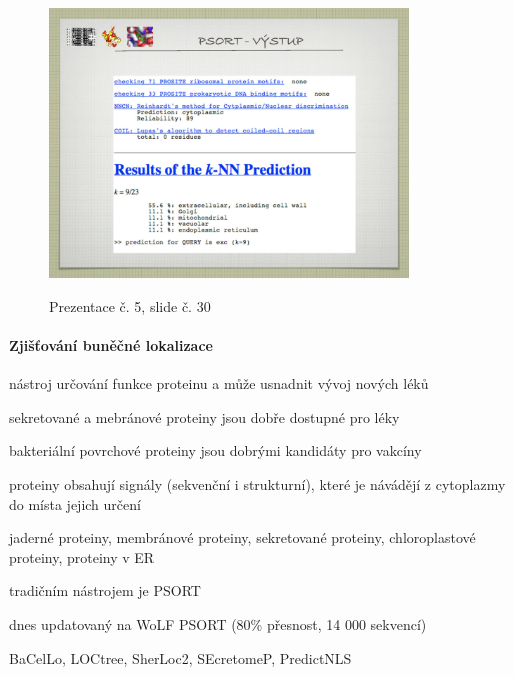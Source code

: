 \documentclass[DIV=8]{scrreprt}
\begin{document}
\begin{figure}
    \caption{Prezentace č. 5, slide č. 30}
    \includegraphics[width=0.85\textwidth]{slides-5/slide-30.jpg}
    \centering
    \label{slides-5-slide-30}
\end{figure}

\paragraph{Zjišťování buněčné lokalizace}
\begin{myItemize}[nosep]
    \item nástroj určování funkce proteinu a může usnadnit vývoj nových léků
\begin{myItemize}[nosep]
    \item sekretované a mebránové proteiny jsou dobře dostupné pro léky
    \item bakteriální povrchové proteiny jsou dobrými kandidáty pro vakcíny
\end{myItemize}

    \item proteiny obsahují signály (sekvenční i strukturní), které je návádějí z cytoplazmy do místa jejich určení
\begin{myItemize}[nosep]
    \item jaderné proteiny, membránové proteiny, sekretované proteiny, chloroplastové proteiny, proteiny v ER
\end{myItemize}

    \item tradičním nástrojem je PSORT
\begin{myItemize}[nosep]
    \item dnes updatovaný na WoLF PSORT (80\% přesnost, 14 000 sekvencí)
\end{myItemize}

    \item BaCelLo, LOCtree, SherLoc2, SEcretomeP, PredictNLS
\end{myItemize}
\end{document}
